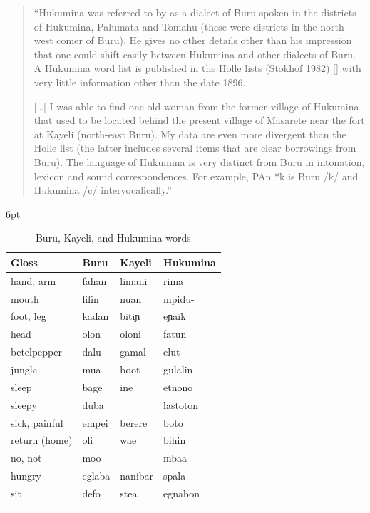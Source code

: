 \begin{quote}
	``Hukumina was referred to by \citet{Hendriks1897} as a dialect of Buru spoken in the districts
	of Hukumina, Palumata and Tomahu (these were districts in the north-west comer of Buru).
	He gives no other details other than his impression that one could shift easily between
	Hukumina and other dialects of Buru. A Hukumina word list is published in the Holle lists
	(Stokhof 1982) [\cite{Stokhof1982b}] with very little information other than the date 1896.
	
	[\ldots] I was able to find one old woman from the former village of Hukumina that used to be
	located behind the present village of Masarete near the fort at Kayeli (north-east Buru). My
	data are even more divergent than the Holle list (the latter includes several items that are
	clear borrowings from Buru). The language of Hukumina is very distinct from Buru in
	intonation, lexicon and sound correspondences. For example, PAn *k is Buru /k/ and
	Hukumina /c/ intervocalically.'' \citep[99]{Grimes2000a}
\end{quote}

\begin{table}
	\centering
	\caption[Buru, Kayeli, and Hukumina words (Grimes 2010: 78)]
	{Buru, Kayeli, and Hukumina words \citep[78]{Grimes2010b}}
	\label{tab:07-19}
	\st{6pt}\begin{tabular}{llll}\lsptoprule
Gloss	&	Buru	&	Kayeli	&	Hukumina	\\	\midrule
hand, arm	&	fahan	&	limani	&	rima	\\	
mouth	&	fifin	&	nuan	&	mpidu-	\\	
foot, leg	&	kadan	&	bitiɲ	&	eɲaik	\\	
head	&	olon	&	oloni	&	fatun	\\	
betelpepper	&	dalu	&	gamal	&	elut	\\	
jungle	&	mua	&	boot	&	gulalin	\\	
sleep	&	bage	&	ine	&	etnono	\\	
sleepy	&	duba	&		&	lastoton	\\	
sick, painful	&	empei	&	berere	&	boto	\\	
return (home)	&	oli	&	wae	&	bihin	\\	
no, not	&	moo	&		&	mbaa	\\	
hungry	&	eglaba	&	nanibar	&	spala	\\	
sit	&	defo	&	stea	&	egnabon	\\	
		\lspbottomrule
	\end{tabular}
\end{table}

